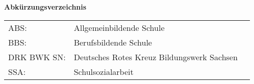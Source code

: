 \textbf{Abkürzungsverzeichnis}\\[1cm]

\begin{tabular}{lll}
ABS: & Allgemeinbildende Schule \\[0,5cm]
BBS: & Berufsbildende Schule \\[0,5cm]
DRK BWK SN: & Deutsches Rotes Kreuz Bildungswerk Sachsen \\[0,5cm]
SSA: & Schulsozialarbeit \\
\end{tabular}